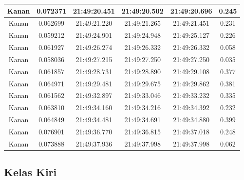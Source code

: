 \begin{longtable}{|c|c|c|c|c|c|}
      Kanan & 0.072371  & 21:49:20.451 & 21:49:20.502 & 21:49:20.696 & 0.245 \\ \hline
      Kanan & 0.062699 & 21:49:21.220 & 21:49:21.265 & 21:49:21.451 & 0.231 \\ \hline
      Kanan & 0.059212 & 21:49:24.901 & 21:49:24.948 & 21:49:25.127 & 0.226 \\ \hline
      Kanan & 0.061927 & 21:49:26.274 & 21:49:26.332 & 21:49:26.332 & 0.058 \\ \hline
      Kanan & 0.058036 & 21:49:27.215 & 21:49:27.250 & 21:49:27.250 & 0.035 \\ \hline
      Kanan & 0.061857 & 21:49:28.731 & 21:49:28.890 & 21:49:29.108 & 0.377 \\ \hline
      Kanan & 0.064971 & 21:49:29.481 & 21:49:29.675 & 21:49:29.862 & 0.381 \\ \hline
      Kanan & 0.061562 & 21:49:32.897 & 21:49:33.046 & 21:49:33.232 & 0.335 \\ \hline
      Kanan & 0.063810 & 21:49:34.160 & 21:49:34.216 & 21:49:34.392 & 0.232 \\ \hline
      Kanan & 0.064849 & 21:49:34.481 & 21:49:34.691 & 21:49:34.880 & 0.399 \\ \hline
      Kanan & 0.076901 & 21:49:36.770 & 21:49:36.815 & 21:49:37.018 & 0.248 \\ \hline
      Kanan & 0.073888 & 21:49:37.936 & 21:49:37.998 & 21:49:37.998 & 0.062 \\ \hline
\end{longtable}

\subsection{Kelas Kiri}

